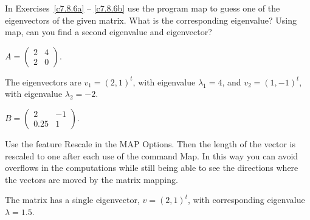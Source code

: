 \documentclass{ximera}
\begin{document}
\noindent In Exercises~\ref{c7.8.6a} -- \ref{c7.8.6b} use the program
{\sf map} to guess one of the eigenvectors of the given matrix.  What is
the corresponding eigenvalue?  Using {\sf map}, can you find a second
eigenvalue and eigenvector?
\begin{exercise} \label{c7.8.6a}
$A=\left(\begin{array}{rr} 2 & 4\\ 2 & 0
\end{array}\right)$.

\begin{solution}
The eigenvectors are $v_1 = (2,1)^t$, with eigenvalue
$\lambda_1 = 4$, and $v_2 = (1,-1)^t$, with eigenvalue $\lambda_2 = -2$.

\end{solution}
\end{exercise}
\begin{exercise} \label{c7.8.6b}
$B=\left(\begin{array}{rr} 2 & -1\\ 0.25 & 1
\end{array}\right)$.

 Use the feature {\sf Rescale} in the
{\sf MAP Options}.  Then the length of the vector is rescaled to one
after each use of the command {\sf Map}. In this way you can avoid
overflows in the computations while still being able to see the
directions where the vectors are moved by the matrix mapping.

\begin{solution}
The matrix has a single eigenvector, $v = (2,1)^t$, with
corresponding eigenvalue $\lambda = 1.5$.

\end{solution}
\end{exercise}
\end{document}

